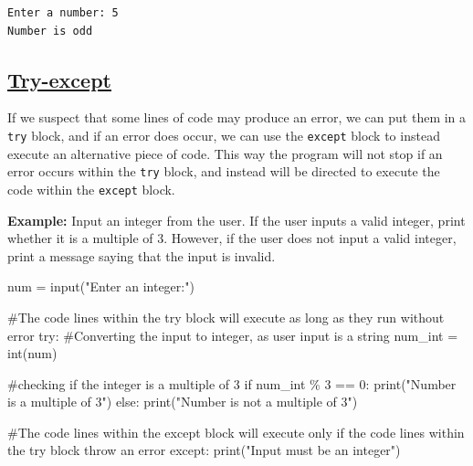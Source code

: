 \documentclass[
  letterpaper,
  DIV=11,
  numbers=noendperiod]{scrreprt}
\newenvironment{Shaded}{\begin{snugshade}}{\end{snugshade}}
\newcommand{\BuiltInTok}[1]{\textcolor[rgb]{0.00,0.23,0.31}{#1}}
\newcommand{\CommentTok}[1]{\textcolor[rgb]{0.37,0.37,0.37}{#1}}
\newcommand{\ControlFlowTok}[1]{\textcolor[rgb]{0.00,0.23,0.31}{#1}}
\newcommand{\DecValTok}[1]{\textcolor[rgb]{0.68,0.00,0.00}{#1}}
\newcommand{\NormalTok}[1]{\textcolor[rgb]{0.00,0.23,0.31}{#1}}
\newcommand{\OperatorTok}[1]{\textcolor[rgb]{0.37,0.37,0.37}{#1}}
\newcommand{\StringTok}[1]{\textcolor[rgb]{0.13,0.47,0.30}{#1}}
\begin{document}
\begin{verbatim}
Enter a number: 5
Number is odd
\end{verbatim}

\hypertarget{try-except}{%
\subsection{\texorpdfstring{\href{https://docs.python.org/3/tutorial/errors.html}{Try-except}}{Try-except}}\label{try-except}}

If we suspect that some lines of code may produce an error, we can put
them in a \texttt{try} block, and if an error does occur, we can use the
\texttt{except} block to instead execute an alternative piece of code.
This way the program will not stop if an error occurs within the
\texttt{try} block, and instead will be directed to execute the code
within the \texttt{except} block.

\textbf{Example:} Input an integer from the user. If the user inputs a
valid integer, print whether it is a multiple of 3. However, if the user
does not input a valid integer, print a message saying that the input is
invalid.

\begin{Shaded}
\begin{Highlighting}[]
\NormalTok{num }\OperatorTok{=} \BuiltInTok{input}\NormalTok{(}\StringTok{"Enter an integer:"}\NormalTok{)}

\CommentTok{\#The code lines within the \textquotesingle{}try\textquotesingle{} block will execute as long as they run without error  }
\ControlFlowTok{try}\NormalTok{:}
    \CommentTok{\#Converting the input to integer, as user input is a string}
\NormalTok{    num\_int }\OperatorTok{=} \BuiltInTok{int}\NormalTok{(num)  }
    
    \CommentTok{\#checking if the integer is a multiple of 3}
    \ControlFlowTok{if}\NormalTok{ num\_int }\OperatorTok{\%} \DecValTok{3} \OperatorTok{==} \DecValTok{0}\NormalTok{:            }
        \BuiltInTok{print}\NormalTok{(}\StringTok{"Number is a multiple of 3"}\NormalTok{)}
    \ControlFlowTok{else}\NormalTok{:}
        \BuiltInTok{print}\NormalTok{(}\StringTok{"Number is not a multiple of 3"}\NormalTok{)}
        
\CommentTok{\#The code lines within the \textquotesingle{}except\textquotesingle{} block will execute only if the code lines within the \textquotesingle{}try\textquotesingle{} block throw an error        }
\ControlFlowTok{except}\NormalTok{:}
    \BuiltInTok{print}\NormalTok{(}\StringTok{"Input must be an integer"}\NormalTok{)}
\end{Highlighting}
\end{Shaded}
\end{document}
